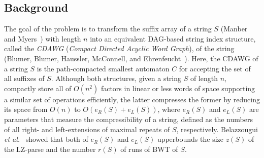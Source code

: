 \subsection{Background}
The goal of the problem is to transform the suffix array of a string $S$ (Manber and Myers~\cite{manber:myers1993suffixarrays}) with length $n$ into an equivalent DAG-based string index structure, called the \textit{CDAWG} (\textit{Compact Directed Acyclic Word Graph}), of the string (Blumer, Blumer, Haussler, McConnell, and Ehrenfeucht~\cite{blumer1987complete}). Here, the CDAWG of a string $S$ is the path-compacted smallest automaton $C$ for accepting the set of all suffixes of $S$.
Although both structures, given a string $S$ of length $n$, compactly%
store all of $O(n^2)$ factors in linear or less words of space supporting a similar set of operations efficiently, the latter compresses the former by reducing its space from $O(n)$ to $O({e_R(S) + e_L(S)})$, where $e_R(S)$ and $e_L(S)$ are parameters that measure the compressibility of a string, defined as the numbers of all right- and left-extensions of maximal repeats of $S$, respectively.
Belazzougui \textit{et al.}~\cite{belazzougui:nunial:gagie:prezza:raffinot2015composite} showed that both of $e_R(S)$ and $e_L(S)$ upperbounds the size $z(S)$ of the LZ-parse and the number $r(S)$ of runs of BWT of $S$.


